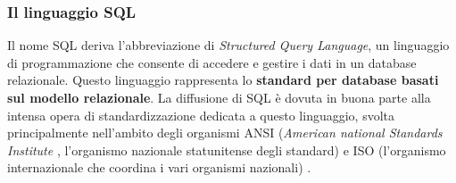\subsubsection{Il linguaggio SQL}
Il nome SQL deriva l’abbreviazione di \textit{Structured Query Language}, un linguaggio di programmazione che consente di accedere e gestire i dati in un database relazionale. Questo linguaggio rappresenta lo \textbf{standard per database basati sul modello relazionale}. La diffusione di SQL è dovuta in buona parte alla intensa opera di standardizzazione dedicata a questo linguaggio, svolta principalmente nell'ambito degli organismi ANSI (\textit{American national Standards Institute} \cite{site:ansi}, l'organismo nazionale statunitense degli standard) e ISO (l'organismo internazionale che coordina i vari organismi nazionali) \cite{site:iso}.


